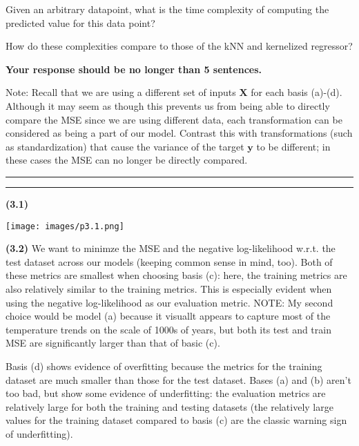 \documentclass[submit]{harvardml}
\newcommand{\question}[2] {\vspace{.25in} \hrule\vspace{0.5em}
\noindent{\bf #1: #2} \vspace{0.5em}
\hrule \vspace{.10in}}
\renewcommand{\part}[1] {\vspace{.10in} {\bf (#1)}}
\begin{document}
\begin{framed}
\begin{enumerate}
Given an arbitrary datapoint, what is the time complexity of computing the predicted value for this data point?

How do these complexities compare to those of the kNN and kernelized regressor?

\textbf{Your response should be no longer than 5 sentences.}

\end{enumerate}
Note:
Recall that we are using a 
different set of inputs $\mathbf{X}$ for each basis (a)-(d). 
Although it may seem as though this prevents us from being able 
to directly compare the MSE since we are using different data, 
each transformation can be considered as being a part of our model. 
Contrast this with transformations (such as standardization) that cause the variance
of the target $\mathbf{y}$ to be different; in these cases the
MSE can no longer be directly compared.

\end{framed}

\newpage
\question{3}{Modeling Climate Change 800,000 Years Ago}
\part{3.1}

\texttt{[image: images/p3.1.png]}

\part{3.2} We want to minimze the MSE and the negative log-likelihood w.r.t. the test dataset across our models (keeping common sense in mind, too). Both of these metrics are smallest when choosing basis (c): here, the training metrics are also relatively similar to the training metrics. This is especially evident when using the negative log-likelihood as our evaluation metric. NOTE: My second choice would be model (a) because it visuallt appears to capture most of the temperature trends on the scale of 1000s of years, but both its test and train MSE are significantly larger than that of basic (c).

Basis (d) shows evidence of overfitting because the metrics for the training dataset are much smaller than those for the test dataset. Bases (a) and (b) aren't too bad, but show some evidence of underfitting: the evaluation metrics are relatively large for both the training and testing datasets (the relatively large values for the training dataset compared to basis (c) are the classic warning sign of underfitting). 
\end{document}
